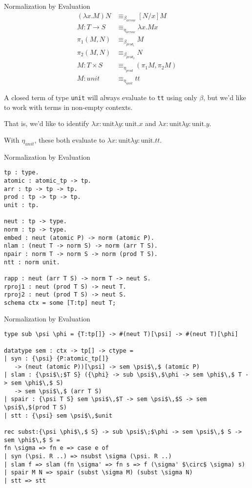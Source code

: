 \documentclass{beamer}
\begin{document}
\begin{frame}[fragile]{Normalization by Evaluation}
\begin{align*}
(\lambda x. M) N &\equiv_{\beta_{arrow}} [N/x]M\\
M : T \rightarrow S &\equiv_{\eta_{arrow}} \lambda x. M x\\
\pi_1 (M , N) &\equiv_{\beta_{prod_1}} M\\
\pi_2 (M , N) &\equiv_{\beta_{prod_2}} N\\
M : T \times S &\equiv_{\eta_{prod}} (\pi_1 M, \pi_2 M)\\
M : unit &\equiv_{\eta_{unit}} tt
\end{align*}

A closed term of type {\tt unit} will always evaluate to {\tt tt} using only $\beta$, but we'd like to work with terms in non-empty contexts.

That is, we'd like to identify $\lambda x:\text{unit} \lambda y:\text{unit}. x$ and $\lambda x:\text{unit} \lambda y:\text{unit}. y$.

With $\eta_{unit}$, these both evaluate to $\lambda x:\text{unit} \lambda y:\text{unit}. tt$.
\end{frame}

\begin{frame}[fragile]{Normalization by Evaluation}
\begin{lstlisting}
tp : type.
atomic : atomic_tp -> tp.
arr : tp -> tp -> tp.
prod : tp -> tp -> tp.
unit : tp.

neut : tp -> type.
norm : tp -> type.
embed : neut (atomic P) -> norm (atomic P).
nlam : (neut T -> norm S) -> norm (arr T S).
npair : norm T -> norm S -> norm (prod T S).
ntt : norm unit.

rapp : neut (arr T S) -> norm T -> neut S.
rproj1 : neut (prod T S) -> neut T.
rproj2 : neut (prod T S) -> neut S.
schema ctx = some [T:tp] neut T;
\end{lstlisting}
\end{frame}

\begin{frame}[fragile]{Normalization by Evaluation}

\begin{lstlisting}
type sub \psi \phi = {T:tp[]} -> #(neut T)[\psi] -> #(neut T)[\phi]

datatype sem : ctx -> tp[] -> ctype =
| syn : {\psi} {P:atomic_tp[]}
   -> (neut (atomic P))[\psi] -> sem \psi$\,$ (atomic P)
| slam : {\psi$\;$T S} ({\phi} -> sub \psi$\,$\phi -> sem \phi$\,$ T -> sem \phi$\,$ S)
   -> sem \psi$\,$ (arr T S)
| spair : {\psi T S} sem \psi$\,$T -> sem \psi$\,$S -> sem \psi$\,$(prod T S)
| stt : {\psi} sem \psi$\,$unit

rec subst:{\psi \phi$\,$ S} -> sub \psi$\;$\phi -> sem \psi$\,$ S -> sem \phi$\,$ S =
fn \sigma => fn e => case e of
| syn (\psi. R ..) => nsubst \sigma (\psi. R ..)
| slam f => slam (fn \sigma' => fn s => f (\sigma' $\circ$ \sigma) s)
| spair M N => spair (subst \sigma M) (subst \sigma N)
| stt => stt
\end{lstlisting}
\end{frame}
\end{document}
